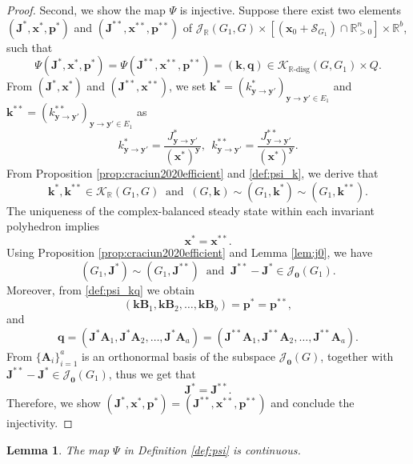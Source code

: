 \documentclass[11pt]{article}
\theoremstyle{plain}
\newtheorem{lemma}[theorem]{Lemma}
\theoremstyle{definition}
\theoremstyle{remark}
\newcommand\RR{\mathbb{R}}
\newcommand\by{\boldsymbol{y}}
\newcommand\bk{\boldsymbol{k}}
\newcommand\bx{\boldsymbol{x}}
\newcommand\bA{\boldsymbol{A}}
\newcommand\bB{\boldsymbol{B}}
\newcommand\bq{\boldsymbol{q}}
\newcommand\bp{\boldsymbol{p}}
\newcommand\bJ{\boldsymbol{J}}
\newcommand{\mK}{\mathcal{K}}
\newcommand{\dK}{\mathcal{K}_{\RR\text{-disg}}}
\newcommand{\mJ}{\mathcal{J}_{\RR}}
\newcommand{\eJ}{\mathcal{J}_{\textbf{0}}}
\newcommand{\mS}{\mathcal{S}}
\begin{document}
\begin{proof}
\medskip

Second, we show the map $\Psi$ is injective. Suppose there exist two elements $(\bJ^*, \bx^*, \bp^*)$ and $(\bJ^{**}, \bx^{**}, \bp^{**})$ of $\mJ(G_1,G)\times [(\bx_0 + \mS_{G_1} )\cap\mathbb{R}^n_{>0}] \times \mathbb{R}^b$,
such that
\[
\Psi (\bJ^*, \bx^*, \bp^*) = \Psi (\bJ^{**}, \bx^{**}, \bp^{**}) = (\bk, \bq) \in \dK(G,G_1)\times Q.
\]
From $(\bJ^*, \bx^*)$ and $(\bJ^{**}, \bx^{**})$, we set
$\bk^* = (k^*_{\by\rightarrow \by'})_{\by\rightarrow \by' \in E_1}$ and $\bk^{**} = (k^{**}_{\by\rightarrow \by'})_{\by\rightarrow \by' \in E_1}$ as
\[
k^*_{\by\rightarrow \by'} = \frac{J^*_{\by\rightarrow \by'}}{{(\bx^*)}^{\by}},
\ \
k^{**}_{\by\rightarrow \by'} = \frac{J^{**}_{\by\rightarrow \by'}}{{(\bx^*)}^{\by}}.
\]
From Proposition \ref{prop:craciun2020efficient} and \eqref{def:psi_k}, we derive that 
\[\bk^*, \bk^{**} \in \mK_{\RR} (G_1,G)
\ \text{ and } \ 
(G, \bk) \sim (G_1, \bk^*) \sim (G_1, \bk^{**}).
\]
The uniqueness of the complex-balanced steady state within each invariant polyhedron implies
\[
\bx^* = \bx^{**}.
\]
Using Proposition \ref{prop:craciun2020efficient} and Lemma \ref{lem:j0}, we have 
\[
(G_1, \bJ^*) \sim (G_1, \bJ^{**})
\ \text{ and } \
\bJ^{**} - \bJ^* \in \eJ(G_1).
\]
Moreover, from \eqref{def:psi_kq} we obtain
\[
(\bk \bB_1, \bk \bB_2, \ldots, \bk \bB_b) = \bp^* =  \bp^{**},
\]
and
\[
\bq = (\bJ^* \bA_1, \bJ^* \bA_2, \ldots, \bJ^* \bA_a) 
= (\bJ^{**} \bA_1, \bJ^{**} \bA_2, \ldots, \bJ^{**} \bA_a).
\]
From $\{\bA_i \}^{a}_{i=1}$ is an orthonormal basis of the subspace $\eJ(G)$, together with $\bJ^{**} - \bJ^* \in \eJ(G_1)$, thus we get that 
\[
\bJ^* = \bJ^{**}.
\]
Therefore, we show $(\bJ^*, \bx^*, \bp^*) = (\bJ^{**}, \bx^{**}, \bp^{**})$ and conclude the injectivity.
\end{proof}

\begin{lemma}
\label{lem:psi_cts} 
The map $\Psi$ in Definition \ref{def:psi} is continuous.
\end{lemma}
\end{document}
